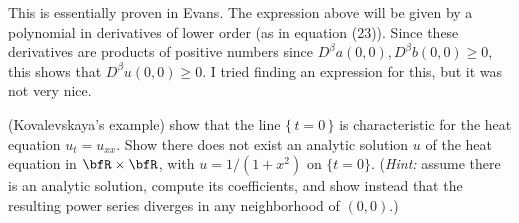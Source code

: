\begin{solution}
  This is essentially proven in Evans. The expression above will be given
  by a polynomial in derivatives of lower order (as in equation
  (23)). Since these derivatives are products of positive numbers since
  \(D^\beta a(0,0),D^\beta b(0,0)\geq 0\), this shows that \(D^\beta
  u(0,0)\geq 0\). I tried finding an expression for this, but it was not
  very nice.
\end{solution}
\newpage

\begin{problem}
  (Kovalevskaya's example) show that the line \(\{\,t=0\,\}\) is
  characteristic for the heat equation \(u_t=u_{xx}\). Show there does not
  exist an analytic solution \(u\) of the heat equation in
  \(\bfR\times\bfR\), with \(u=1/(1+x^2)\) on \(\{t=0\}\). (\emph{Hint:}
  assume there is an analytic solution, compute its coefficients, and show
  instead that the resulting power series diverges in any neighborhood of
  \((0,0)\).)
\end{problem}
